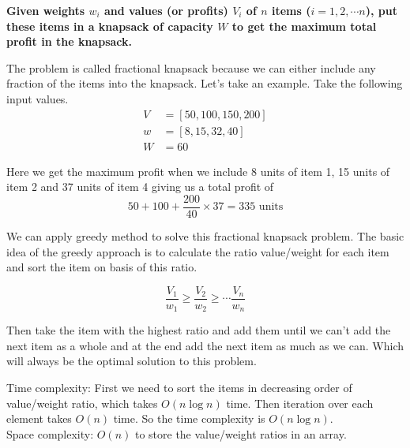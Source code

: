 \documentclass[a4paper,11pt]{book}
\begin{document}
\noindent \textbf{Given weights $w_i$ and values (or profits) $V_i$ of $n$ items ($i = 1,2,\cdots n$), put these items in a knapsack of capacity $W$ to get the maximum total profit in the knapsack.}

\vspace{3mm}

\noindent The problem is called fractional knapsack because we can either include any fraction of the items into the knapsack. Let’s take an example. Take the following input values.
\begin{align*}
V &= [50,100,150,200]\\
w &= [8,15,32,40]\\
W &= 60
\end{align*}

\noindent Here we get the maximum profit when we include 8 units of item 1, 15 units of item 2 and 37 units of item 4 giving us a total profit of 
$$50 + 100 + \dfrac{200}{40}\times 37= 335 \text{ units}$$

\noindent We can apply greedy method to solve this fractional knapsack problem. The basic idea of the greedy approach is to calculate the ratio value/weight for each item and sort the item on basis of this ratio.

$$\dfrac{V_1}{w_1} \geq \dfrac{V_2}{w_2} \geq \cdots \dfrac{V_n}{w_n}$$

\noindent Then take the item with the highest ratio and add them until we can’t add the next item as a whole and at the end add the next item as much as we can. Which will always be the optimal solution to this problem.

\vspace{5mm}
\noindent Time complexity: First we need to sort the items in decreasing order of value/weight ratio, which takes $O(n\log n)$ time. Then iteration over each element takes $O(n)$ time. So the time complexity is $O(n\log n)$.\\
\noindent Space complexity: $O(n)$ to store the value/weight ratios in an array.
\end{document}

